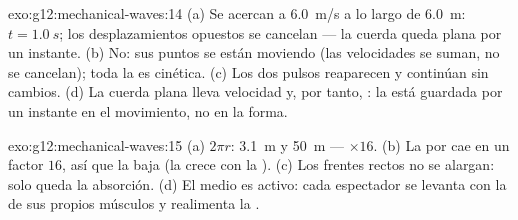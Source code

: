 \begin{solution}{exo:g12:mechanical-waves:14}
(a) Se acercan a \qty{6.0}{m/s} a lo largo de \qty{6.0}{m}:
$t = \qty{1.0}{s}$; los desplazamientos opuestos se cancelan --- la
cuerda queda plana por un instante. (b) No: sus puntos se están moviendo
(las velocidades  se suman, no se cancelan); toda la
 es cinética. (c) Los dos pulsos reaparecen y continúan sin
cambios. (d) La cuerda plana lleva velocidad y, por tanto, : la
 está guardada por un instante en el movimiento, no en la forma.
\end{solution}

\begin{solution}{exo:g12:mechanical-waves:15}
(a) $2\pi r$: \qty{3.1}{m} y \qty{50}{m} --- $\times 16$. (b) La 
por  cae en un factor $16$, así que la  baja (la 
crece con la ). (c) Los frentes rectos no se alargan: solo queda
la absorción. (d) El medio es activo: cada espectador se levanta con la
 de sus propios músculos y realimenta la .
\end{solution}


